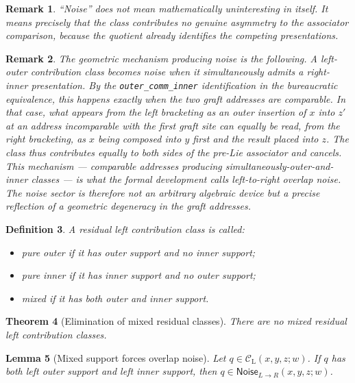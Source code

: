 \documentclass[11pt]{article}
\newtheorem{theorem}{Theorem}
\newtheorem{lemma}[theorem]{Lemma}
\newtheorem{definition}[theorem]{Definition}
\newtheorem{remark}[theorem]{Remark}
\newcommand{\CL}{\mathcal{C}_{\mathrm{L}}}
\newcommand{\Noise}{\mathsf{Noise}}
\begin{document}
\begin{remark}
``Noise'' does not mean mathematically uninteresting in itself. It means
precisely that the class contributes no genuine asymmetry to the associator
comparison, because the quotient already identifies the competing
presentations.
\end{remark}

\begin{remark}
The geometric mechanism producing noise is the following. A left-outer
contribution class becomes noise when it simultaneously admits a right-inner
presentation. By the \texttt{outer\_comm\_inner} identification in the
bureaucratic equivalence, this happens exactly when the two graft addresses
are comparable. In that case, what appears from the left bracketing as an
outer insertion of $x$ into $z'$ at an address incomparable with the first
graft site can equally be read, from the
right bracketing, as $x$ being composed into $y$ first and the result placed
into $z$. The class thus contributes equally to both sides of the pre-Lie
associator and cancels. This mechanism --- comparable addresses producing
simultaneously-outer-and-inner classes --- is what the formal development
calls \emph{left-to-right overlap noise}. The noise sector is therefore not
an arbitrary algebraic device but a precise reflection of a geometric
degeneracy in the graft addresses.
\end{remark}

\begin{definition}
A residual left contribution class is called:
\begin{itemize}
\item \emph{pure outer} if it has outer support and no inner support;
\item \emph{pure inner} if it has inner support and no outer support;
\item \emph{mixed} if it has both outer and inner support.
\end{itemize}
\end{definition}

\begin{theorem}[Elimination of mixed residual classes]
There are no mixed residual left contribution classes.
\end{theorem}

\begin{lemma}[Mixed support forces overlap noise]
Let \(q\in \CL(x,y,z;w)\). If \(q\) has both left outer support and left inner
support, then \(q\in \Noise_{L\to R}(x,y,z;w)\).
\end{lemma}
\end{document}
